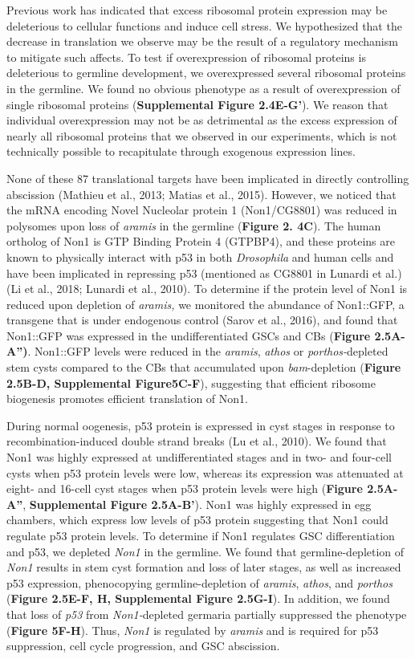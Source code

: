 \documentclass[12pt,twoside]{reedthesis}
\begin{document}
Previous work has indicated that excess ribosomal protein expression may
be deleterious to cellular functions and induce cell stress. We
hypothesized that the decrease in translation we observe may be the
result of a regulatory mechanism to mitigate such affects. To test if
overexpression of ribosomal proteins is deleterious to germline
development, we overexpressed several ribosomal proteins in the
germline. We found no obvious phenotype as a result of overexpression of
single ribosomal proteins (\textbf{Supplemental Figure 2.4E-G'}). We reason that individual
overexpression may not be as detrimental as the excess expression of
nearly all ribosomal proteins that we observed in our experiments, which
is not technically possible to recapitulate through exogenous expression
lines.

None of these 87 translational targets have been implicated in directly
controlling abscission (Mathieu et al., 2013; Matias et al., 2015). However, we
noticed that the mRNA encoding Novel Nucleolar protein 1 (Non1/CG8801)
was reduced in polysomes upon loss of \emph{aramis} in the germline (\textbf{Figure 2.
4C}). The human ortholog of Non1 is GTP Binding Protein 4 (GTPBP4), and
these proteins are known to physically interact with p53 in both
\emph{Drosophila} and human cells and have been implicated in repressing p53
(mentioned as CG8801 in Lunardi et al.) (Li et al., 2018; Lunardi et al., 2010).
To determine if the protein level of Non1 is reduced upon depletion of
\emph{aramis,} we monitored the abundance of Non1::GFP, a transgene that is
under endogenous control (Sarov et al., 2016), and
found that Non1::GFP was expressed in the undifferentiated GSCs and CBs
(\textbf{Figure 2.5A-A'')}. Non1::GFP levels were reduced in the \emph{aramis},
\emph{athos} or \emph{porthos-}depleted stem cysts compared to the CBs that
accumulated upon \emph{bam}-depletion (\textbf{Figure 2.5B-D, Supplemental Figure5C-F}),
suggesting that efficient ribosome biogenesis promotes efficient
translation of Non1.

During normal oogenesis, p53 protein is expressed in cyst stages in
response to recombination-induced double strand breaks
(Lu et al., 2010). We found that Non1 was highly
expressed at undifferentiated stages and in two- and four-cell cysts
when p53 protein levels were low, whereas its expression was attenuated
at eight- and 16-cell cyst stages when p53 protein levels were high
(\textbf{Figure 2.5A-A''}, \textbf{Supplemental Figure 2.5A-B'}). Non1 was highly expressed in egg
chambers, which express low levels of p53 protein suggesting that Non1
could regulate p53 protein levels. To determine if Non1 regulates GSC
differentiation and p53, we depleted \emph{Non1} in the germline. We found
that germline-depletion of \emph{Non1} results in stem cyst formation and
loss of later stages, as well as increased p53 expression, phenocopying
germline-depletion of \emph{aramis}, \emph{athos}, and \emph{porthos} (\textbf{Figure 2.5E-F,
H, Supplemental Figure 2.5G-I}). In addition, we found that loss of \emph{p53} from
\emph{Non1-}depleted germaria partially suppressed the phenotype (\textbf{Figure
5F-H}). Thus, \emph{Non1} is regulated by \emph{aramis} and is required for p53
suppression, cell cycle progression, and GSC abscission.
\end{document}
